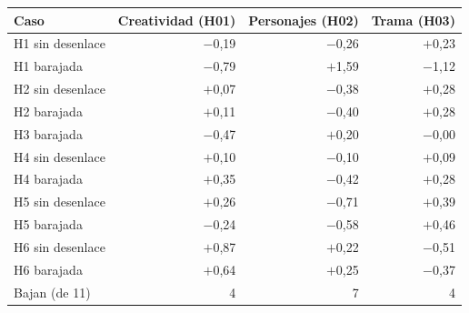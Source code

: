 \begin{tabular}{@{}lrrr@{}}
\toprule
Caso & Creatividad (H01) & Personajes (H02) & Trama (H03) \\
\midrule
H1 sin desenlace & $-$0,19 & $-$0,26 & $+$0,23 \\
H1 barajada & $-$0,79 & $+$1,59 & $-$1,12 \\
H2 sin desenlace & $+$0,07 & $-$0,38 & $+$0,28 \\
H2 barajada & $+$0,11 & $-$0,40 & $+$0,28 \\
H3 barajada & $-$0,47 & $+$0,20 & $-$0,00 \\
H4 sin desenlace & $+$0,10 & $-$0,10 & $+$0,09 \\
H4 barajada & $+$0,35 & $-$0,42 & $+$0,28 \\
H5 sin desenlace & $+$0,26 & $-$0,71 & $+$0,39 \\
H5 barajada & $-$0,24 & $-$0,58 & $+$0,46 \\
H6 sin desenlace & $+$0,87 & $+$0,22 & $-$0,51 \\
H6 barajada & $+$0,64 & $+$0,25 & $-$0,37 \\
Bajan (de 11) & 4 & 7 & 4 \\
\bottomrule
\end{tabular}
